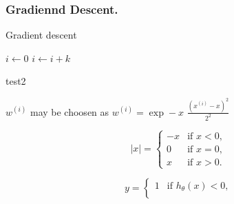 \documentclass[10pt]{beamer}
\begin{document}
\frametitle{Gradiennd Descent.}



\begin{algorithm}
\caption{Gradient descent}
\begin{algorithmic}
        \STATE $i\gets 0$
\ELSE
                \STATE $i\gets i+k$
        \ENDIF
\ENDIF 
\end{algorithmic}

\end{algorithm}



\begin{frame}{test2}

$w^{(i)}$ may be choosen as  $w^{(i)} =  \exp  -x$%
$\frac{(x^{(i)} - x)^2}{2^2}$

\begin{equation*}
|x| =
\begin{cases}
-x & \text{if } x < 0,\\
0 & \text{if } x = 0,\\
x & \text{if } x > 0.
\end{cases}
\end{equation*}

\begin{equation*}
		y =
		\begin{cases}
			1 & \text{if } h_\theta(x) < 0,\\
			
		\end{cases}
	\end{equation*}

\end{frame}
\end{document}

